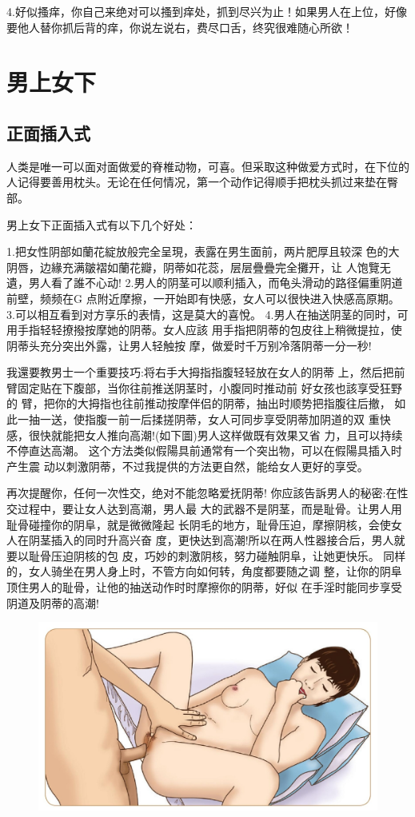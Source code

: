 \documentclass[12pt,UTF8]{ctexbook}
\begin{document}
4.好似搔痒，你自己来绝对可以搔到痒处，抓到尽兴为止！如果男人在上位，好像要他人替你抓后背的痒，你说左说右，费尽口舌，终究很难随心所欲！

\section{男上女下}

\subsection{正面插入式}

人类是唯一可以面对面做爱的脊椎动物，可喜。但采取这种做爱方式时，在下位的人记得要善用枕头。无论在任何情况，第一个动作记得顺手把枕头抓过来垫在臀部。

男上女下正面插入式有以下几个好处：

1.把女性阴部如蘭花綻放般完全呈現，表露在男生面前，两片肥厚且较深
色的大阴唇，边緣充满皺褶如蘭花瓣，阴蒂如花蕊，层层疊疊完全攤开，让
人饱覽无遺，男人看了誰不心动!
2.男人的阴茎可以顺利插入，而龟头滑动的路径偏重阴道前壁，频频在G
点附近摩擦，一开始即有快感，女人可以很快进入快感高原期。
3.可以相互看到对方享乐的表情，这是莫大的喜悅。
4.男人在抽送阴茎的同时，可用手指轻轻撩撥按摩她的阴蒂。女人应該
用手指把阴蒂的包皮往上稍微提拉，使阴蒂头充分突出外露，让男人轻触按
摩，做爱时千万别冷落阴蒂一分一秒!

我還要教男士一个重要技巧:将右手大拇指指腹轻轻放在女人的阴蒂
上，然后把前臂固定贴在下腹部，当你往前推送阴茎时，小腹同时推动前
好女孩也該享受狂野的
臂，把你的大拇指也往前推动按摩伴侣的阴蒂，抽出时顺势把指腹往后撤，
如此一抽一送，使指腹一前一后揉搓阴蒂，女人可同步享受阴蒂加阴道的双
重快感，很快就能把女人推向高潮!(如下圖)男人这样做既有效果又省
力，且可以持续不停直达高潮。
这个方法类似假陽具前通常有一个突出物，可以在假陽具插入时产生震
动以刺激阴蒂，不过我提供的方法更自然，能给女人更好的享受。

再次提醒你，任何一次性交，绝对不能忽略爱抚阴蒂!
你应該告訴男人的秘密:在性交过程中，要让女人达到高潮，男人最
大的武器不是阴茎，而是耻骨。让男人用耻骨碰撞你的阴阜，就是微微隆起
长阴毛的地方，耻骨压迫，摩擦阴核，会使女人在阴茎插入的同时升高兴奋
度，更快达到高潮!所以在两人性器接合后，男人就要以耻骨压迫阴核的包
皮，巧妙的刺激阴核，努力碰触阴阜，让她更快乐。
同样的，女人骑坐在男人身上时，不管方向如何转，角度都要随之调
整，让你的阴阜顶住男人的耻骨，让他的抽送动作时时摩擦你的阴蒂，好似
在手淫时能同步享受阴道及阴蒂的高潮!

\begin{figure}[htbp]
	\centering
	\includegraphics[width=0.7\linewidth]{27}
	\caption{}
	\label{fig:1}
\end{figure}
\end{document}
